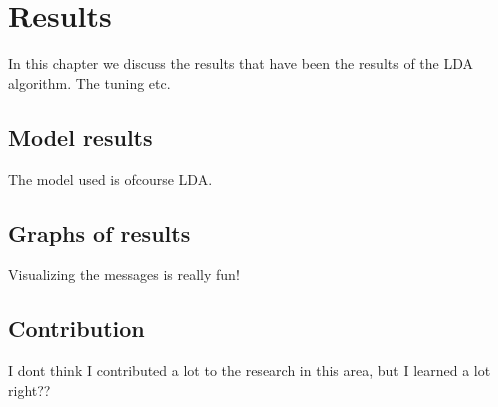 \chapter{Results}
\label{ch:result}

In this chapter we discuss the results that have been the results of the LDA algorithm. The tuning etc.

\section{Model results}
The model used is ofcourse LDA.

\section{Graphs of results}
Visualizing the messages is really fun!

\section{Contribution}
I dont think I contributed a lot to the research in this area, but I learned a lot right??

